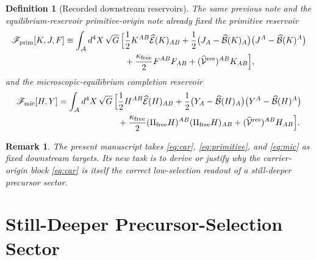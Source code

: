 \documentclass[11pt]{article}
\newcommand{\Sub}{\mathcal A}
\newcommand{\ResidualLift}{\widehat{\mathcal V}^{\mathrm{res}}}
\newcommand{\SubEinLin}{\widehat{\mathcal E}}
\newcommand{\SubGaugeVec}{\widehat{\mathcal B}}
\newcommand{\FreeProj}{\Pi_{\mathrm{free}}}
\newcommand{\GaugeAux}{Y}
\newcommand{\MicFunctional}{\mathscr F_{\mathrm{mic}}}
\newcommand{\PrimFunctional}{\mathscr F_{\mathrm{prim}}}
\newcommand{\FreeStiff}{\kappa_{\mathrm{free}}}
\newcommand{\PrimStrain}{K}
\newcommand{\PrimNeutral}{J}
\newcommand{\PrimFree}{F}
\newtheorem{definition}{Definition}
\newtheorem{remark}{Remark}
\begin{document}
\begin{definition}[Recorded downstream reservoirs]
\label{def:downstream}
The same previous note and the equilibrium-reservoir primitive-origin note already fixed the primitive reservoir
\begin{equation}
\begin{aligned}
\PrimFunctional[\PrimStrain,\PrimNeutral,\PrimFree]
\equiv
\int_{\Sub} d^4X\,\sqrt{G}\,
\Bigl[
&\frac12 \PrimStrain^{AB}\SubEinLin(\PrimStrain)_{AB}
+\frac12\bigl(\PrimNeutral_A-\SubGaugeVec(\PrimStrain)_A\bigr)
\bigl(\PrimNeutral^A-\SubGaugeVec(\PrimStrain)^A\bigr)
\\
&+\frac{\FreeStiff}{2}\PrimFree^{AB}\PrimFree_{AB}
+(\ResidualLift)^{AB}\PrimStrain_{AB}
\Bigr],
\end{aligned}
\label{eq:primitive}
\end{equation}
and the microscopic-equilibrium completion reservoir
\begin{equation}
\begin{aligned}
\MicFunctional[H,\GaugeAux]
=
\int_{\Sub} d^4X\,\sqrt{G}\,
\Bigl[
&\frac12 H^{AB}\SubEinLin(H)_{AB}
+\frac12\bigl(\GaugeAux_A-\SubGaugeVec(H)_A\bigr)
\bigl(\GaugeAux^A-\SubGaugeVec(H)^A\bigr)
\\
&+\frac{\FreeStiff}{2}(\FreeProj H)^{AB}(\FreeProj H)_{AB}
+(\ResidualLift)^{AB}H_{AB}
\Bigr].
\end{aligned}
\label{eq:mic}
\end{equation}
\end{definition}

\begin{remark}
The present manuscript takes \eqref{eq:car}, \eqref{eq:primitive}, and \eqref{eq:mic} as fixed downstream targets. Its new task is to derive or justify why the carrier-origin block \eqref{eq:car} is itself the correct low-selection readout of a still-deeper precursor sector.
\end{remark}

\section{Still-Deeper Precursor-Selection Sector}
\end{document}
